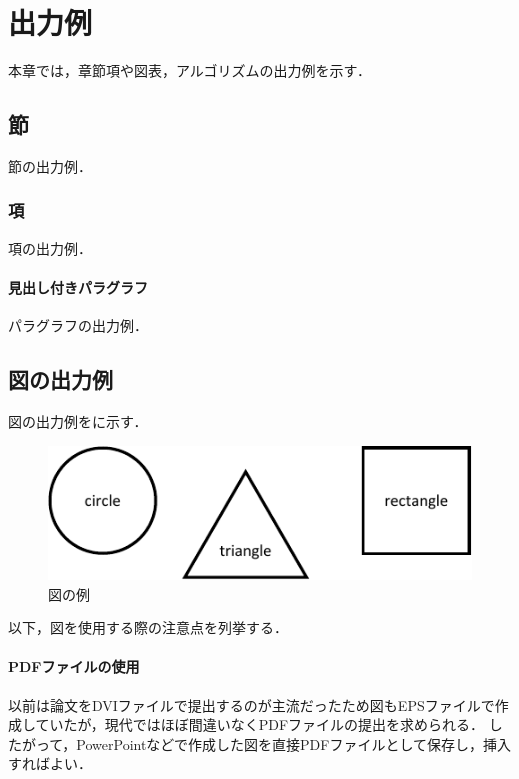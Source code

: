 
\section{出力例}

本章では，章節項や図表，アルゴリズムの出力例を示す．



\subsection{節}

節の出力例．


\subsubsection{項}

項の出力例．

\paragraph{見出し付きパラグラフ}

パラグラフの出力例．



\subsection{図の出力例}

図の出力例を\Fig{\ref{fig:sample}}に示す．

\begin{figure}[t]
  \centering
  \includegraphics{./figures/sample_figure.pdf}
  \caption{図の例}
  \label{fig:sample}
\end{figure}

以下，図を使用する際の注意点を列挙する．

\paragraph{PDFファイルの使用}

以前は論文をDVIファイルで提出するのが主流だったため図もEPSファイルで作成していたが，現代ではほぼ間違いなくPDFファイルの提出を求められる．
したがって，PowerPointなどで作成した図を直接PDFファイルとして保存し，挿入すればよい．

